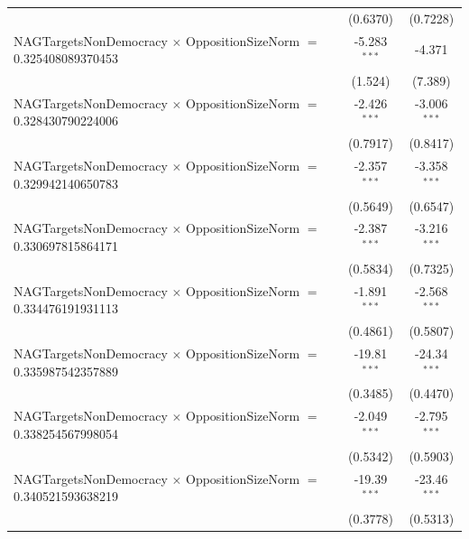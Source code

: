 \begin{tabular}{lcc}
                                                                                & (0.6370)             & (0.7228)\\   
   NAGTargetsNonDemocracy $\times$ OppositionSizeNorm $=$ 0.325408089370453     & -5.283$^{***}$       & -4.371\\   
                                                                                & (1.524)              & (7.389)\\   
   NAGTargetsNonDemocracy $\times$ OppositionSizeNorm $=$ 0.328430790224006     & -2.426$^{***}$       & -3.006$^{***}$\\   
                                                                                & (0.7917)             & (0.8417)\\   
   NAGTargetsNonDemocracy $\times$ OppositionSizeNorm $=$ 0.329942140650783     & -2.357$^{***}$       & -3.358$^{***}$\\   
                                                                                & (0.5649)             & (0.6547)\\   
   NAGTargetsNonDemocracy $\times$ OppositionSizeNorm $=$ 0.330697815864171     & -2.387$^{***}$       & -3.216$^{***}$\\   
                                                                                & (0.5834)             & (0.7325)\\   
   NAGTargetsNonDemocracy $\times$ OppositionSizeNorm $=$ 0.334476191931113     & -1.891$^{***}$       & -2.568$^{***}$\\   
                                                                                & (0.4861)             & (0.5807)\\   
   NAGTargetsNonDemocracy $\times$ OppositionSizeNorm $=$ 0.335987542357889     & -19.81$^{***}$       & -24.34$^{***}$\\   
                                                                                & (0.3485)             & (0.4470)\\   
   NAGTargetsNonDemocracy $\times$ OppositionSizeNorm $=$ 0.338254567998054     & -2.049$^{***}$       & -2.795$^{***}$\\   
                                                                                & (0.5342)             & (0.5903)\\   
   NAGTargetsNonDemocracy $\times$ OppositionSizeNorm $=$ 0.340521593638219     & -19.39$^{***}$       & -23.46$^{***}$\\   
                                                                                & (0.3778)             & (0.5313)\\   

\end{tabular}
